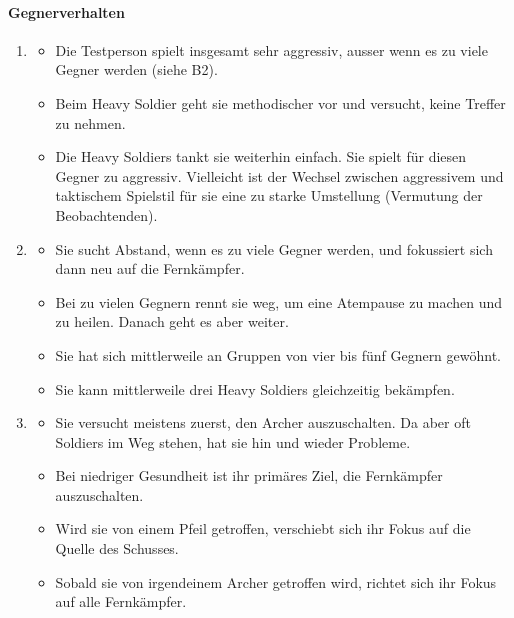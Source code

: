 \documentclass[../Main.tex]{subfiles}
\begin{document}
\paragraph{Gegnerverhalten}
\begin{enumerate}[label=\textbf{B\arabic*}, leftmargin=1.5cm, itemsep=0.8em]
    \item
        \begin{itemize}[nosep]
            \item Die Testperson spielt insgesamt sehr aggressiv, ausser wenn es zu viele Gegner werden (siehe B2).
            \item Beim Heavy Soldier geht sie methodischer vor und versucht, keine Treffer zu nehmen.
            \item Die Heavy Soldiers tankt sie weiterhin einfach. Sie spielt für diesen Gegner zu aggressiv. Vielleicht ist der Wechsel zwischen aggressivem und taktischem Spielstil für sie eine zu starke Umstellung (Vermutung der Beobachtenden).
        \end{itemize}

    \item
        \begin{itemize}[nosep]
            \item Sie sucht Abstand, wenn es zu viele Gegner werden, und fokussiert sich dann neu auf die Fernkämpfer.
            \item Bei zu vielen Gegnern rennt sie weg, um eine Atempause zu machen und zu heilen. Danach geht es aber weiter.
            \item Sie hat sich mittlerweile an Gruppen von vier bis fünf Gegnern gewöhnt.
            \item Sie kann mittlerweile drei Heavy Soldiers gleichzeitig bekämpfen.
        \end{itemize}

    \item
        \begin{itemize}[nosep]
            \item Sie versucht meistens zuerst, den Archer auszuschalten. Da aber oft Soldiers im Weg stehen, hat sie hin und wieder Probleme.
            \item Bei niedriger Gesundheit ist ihr primäres Ziel, die Fernkämpfer auszuschalten.
            \item Wird sie von einem Pfeil getroffen, verschiebt sich ihr Fokus auf die Quelle des Schusses.
            \item Sobald sie von irgendeinem Archer getroffen wird, richtet sich ihr Fokus auf alle Fernkämpfer.
        \end{itemize}


\end{enumerate}
\end{document}

